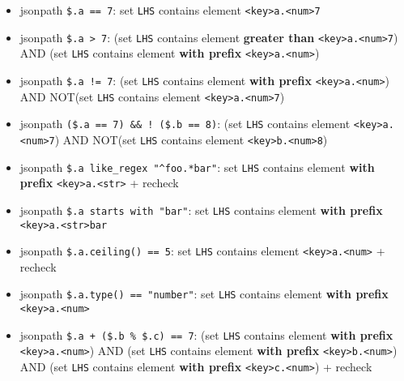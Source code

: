 \documentclass[11pt]{article}
\providecommand{\tightlist}{%
  \setlength{\itemsep}{0pt}\setlength{\parskip}{0pt}}
\begin{document}
\begin{itemize}
  \begin{itemize}
  \tightlist
  \item
    jsonpath \texttt{\$.a\ ==\ 7}: set \texttt{LHS} contains element
    \texttt{\textless{}key\textgreater{}a.\textless{}num\textgreater{}7}
  \item
    jsonpath \texttt{\$.a\ \textgreater{}\ 7}: (set \texttt{LHS}
    contains element \textbf{greater than}
    \texttt{\textless{}key\textgreater{}a.\textless{}num\textgreater{}7})
    AND (set \texttt{LHS} contains element \textbf{with prefix}
    \texttt{\textless{}key\textgreater{}a.\textless{}num\textgreater{}})
  \item
    jsonpath \texttt{\$.a\ !=\ 7}: (set \texttt{LHS} contains element
    \textbf{with prefix}
    \texttt{\textless{}key\textgreater{}a.\textless{}num\textgreater{}})
    AND NOT(set \texttt{LHS} contains element
    \texttt{\textless{}key\textgreater{}a.\textless{}num\textgreater{}7})
  \item
    jsonpath \texttt{(\$.a\ ==\ 7)\ \&\&\ !\ (\$.b\ ==\ 8)}: (set
    \texttt{LHS} contains element
    \texttt{\textless{}key\textgreater{}a.\textless{}num\textgreater{}7})
    AND NOT(set \texttt{LHS} contains element
    \texttt{\textless{}key\textgreater{}b.\textless{}num\textgreater{}8})
  \item
    jsonpath \texttt{\$.a\ like\_regex\ "\^{}foo.*bar"}: set
    \texttt{LHS} contains element \textbf{with prefix}
    \texttt{\textless{}key\textgreater{}a.\textless{}str\textgreater{}}
    + recheck
  \item
    jsonpath \texttt{\$.a\ starts\ with\ "bar"}: set \texttt{LHS}
    contains element \textbf{with prefix}
    \texttt{\textless{}key\textgreater{}a.\textless{}str\textgreater{}bar}
  \item
    jsonpath \texttt{\$.a.ceiling()\ ==\ 5}: set \texttt{LHS} contains
    element
    \texttt{\textless{}key\textgreater{}a.\textless{}num\textgreater{}}
    + recheck
  \item
    jsonpath \texttt{\$.a.type()\ ==\ "number"}: set \texttt{LHS}
    contains element \textbf{with prefix}
    \texttt{\textless{}key\textgreater{}a.\textless{}num\textgreater{}}
  \item
    jsonpath \texttt{\$.a\ +\ (\$.b\ \%\ \$.c)\ ==\ 7}: (set
    \texttt{LHS} contains element \textbf{with prefix}
    \texttt{\textless{}key\textgreater{}a.\textless{}num\textgreater{}})
    AND (set \texttt{LHS} contains element \textbf{with prefix}
    \texttt{\textless{}key\textgreater{}b.\textless{}num\textgreater{}})
    AND (set \texttt{LHS} contains element \textbf{with prefix}
    \texttt{\textless{}key\textgreater{}c.\textless{}num\textgreater{}})
    + recheck
  \end{itemize}
\end{itemize}
\end{document}
